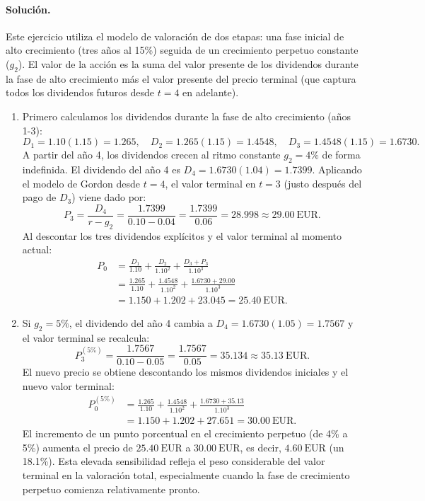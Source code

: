\documentclass[12pt,a4paper]{article}
\newcommand{\EUR}[1]{\ensuremath{#1~\text{EUR}}}
\newenvironment{solucion}{\paragraph{Solución.}}{}
\begin{document}
\begin{solucion}
Este ejercicio utiliza el modelo de valoración de dos etapas: una fase inicial de alto crecimiento (tres años al 15\%) seguida de un crecimiento perpetuo constante ($g_2$). El valor de la acción es la suma del valor presente de los dividendos durante la fase de alto crecimiento más el valor presente del precio terminal (que captura todos los dividendos futuros desde $t=4$ en adelante).

\begin{enumerate}[label=\alph*)]
  \item Primero calculamos los dividendos durante la fase de alto crecimiento (años 1-3):
  \[
  D_1 = 1.10(1.15) = 1.265,\quad D_2 = 1.265(1.15) = 1.4548,\quad D_3 = 1.4548(1.15) = 1.6730.
  \]
  A partir del año 4, los dividendos crecen al ritmo constante $g_2=4\%$ de forma indefinida. El dividendo del año 4 es $D_4 = 1.6730(1.04) = 1.7399$. Aplicando el modelo de Gordon desde $t=4$, el valor terminal en $t=3$ (justo después del pago de $D_3$) viene dado por:
  \[
  P_3 = \frac{D_4}{r-g_2} = \frac{1.7399}{0.10-0.04} = \frac{1.7399}{0.06} = 28.998 \approx \EUR{29.00}.
  \]
  Al descontar los tres dividendos explícitos y el valor terminal al momento actual:
  \begin{align*}
  P_0 &= \frac{D_1}{1.10} + \frac{D_2}{1.10^2} + \frac{D_3 + P_3}{1.10^3}\\
      &= \frac{1.265}{1.10} + \frac{1.4548}{1.10^2} + \frac{1.6730 + 29.00}{1.10^3}\\
      &= 1.150 + 1.202 + 23.045 = \EUR{25.40}.
  \end{align*}
  
  \item Si $g_2=5\%$, el dividendo del año 4 cambia a $D_4 = 1.6730(1.05) = 1.7567$ y el valor terminal se recalcula:
  \[
  P_3^{(5\%)} = \frac{1.7567}{0.10-0.05} = \frac{1.7567}{0.05} = 35.134 \approx \EUR{35.13}.
  \]
  El nuevo precio se obtiene descontando los mismos dividendos iniciales y el nuevo valor terminal:
  \begin{align*}
  P_0^{(5\%)} &= \frac{1.265}{1.10} + \frac{1.4548}{1.10^2} + \frac{1.6730 + 35.13}{1.10^3}\\
               &= 1.150 + 1.202 + 27.651 = \EUR{30.00}.
  \end{align*}
  El incremento de un punto porcentual en el crecimiento perpetuo (de 4\% a 5\%) aumenta el precio de \EUR{25.40} a \EUR{30.00}, es decir, \EUR{4.60} (un 18.1\%). Esta elevada sensibilidad refleja el peso considerable del valor terminal en la valoración total, especialmente cuando la fase de crecimiento perpetuo comienza relativamente pronto.
  

\end{enumerate}
\end{solucion}
\end{document}
